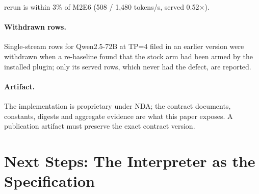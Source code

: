 \documentclass{article}
\begin{document}
rerun is within 3\% of M2E6 (508 / 1,480 tokens/s, served 0.52$\times$).  \paragraph{Withdrawn rows.}  Single-stream
rows for Qwen2.5-72B at TP=4 filed in an earlier version were withdrawn when a re-baseline found
that the stock arm had been armed by the installed plugin; only its served rows, which never
had the defect, are reported.  \paragraph{Artifact.}  The implementation is
proprietary under NDA; the contract documents, constants, digests and aggregate evidence are
what this paper exposes.  A publication artifact must preserve the exact contract version.

\section{Next Steps: The Interpreter as the Specification}
\label{sec:nextsteps}
\end{document}
